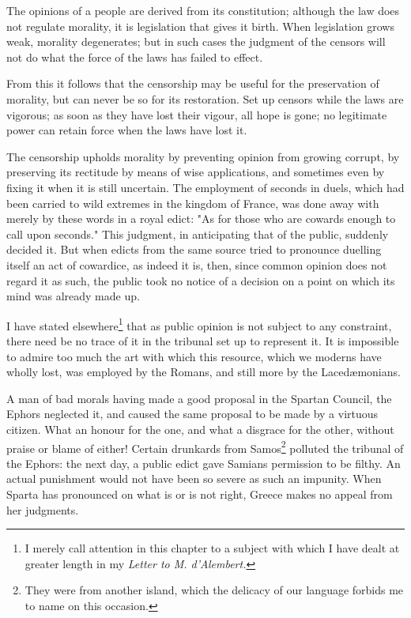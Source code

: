 \documentclass[12pt]{book}
\begin{document}
The opinions of a people are derived from its constitution; although the law does not regulate morality, it is legislation that gives it birth. When legislation grows weak, morality degenerates; but in such cases the judgment of the censors will not do what the force of the laws has failed to effect.

From this it follows that the censorship may be useful for the preservation of morality, but can never be so for its restoration. Set up censors while the laws are vigorous; as soon as they have lost their vigour, all hope is gone; no legitimate power can retain force when the laws have lost it.

The censorship upholds morality by preventing opinion from growing corrupt, by preserving its rectitude by means of wise applications, and sometimes even by fixing it when it is still uncertain. The employment of seconds in duels, which had been carried to wild extremes in the kingdom of France, was done away with merely by these words in a royal edict: "As for those who are cowards enough to call upon seconds." This judgment, in anticipating that of the public, suddenly decided it. But when edicts from the same source tried to pronounce duelling itself an act of cowardice, as indeed it is, then, since common opinion does not regard it as such, the public took no notice of a decision on a point on which its mind was already made up.

I have stated elsewhere\footnote{I merely call attention in this chapter to a subject with which I have dealt at greater length in my \textit{Letter to M. d'Alembert.}} that as public opinion is not subject to any constraint, there need be no trace of it in the tribunal set up to represent it. It is impossible to admire too much the art with which this resource, which we moderns have wholly lost, was employed by the Romans, and still more by the Lacedæmonians.

A man of bad morals having made a good proposal in the Spartan Council, the Ephors neglected it, and caused the same proposal to be made by a virtuous citizen. What an honour for the one, and what a disgrace for the other, without praise or blame of either! Certain drunkards from Samos\footnote{They were from another island, which the delicacy of our language forbids me to name on this occasion.} polluted the tribunal of the Ephors: the next day, a public edict gave Samians permission to be filthy. An actual punishment would not have been so severe as such an impunity. When Sparta has pronounced on what is or is not right, Greece makes no appeal from her judgments.
\end{document}
